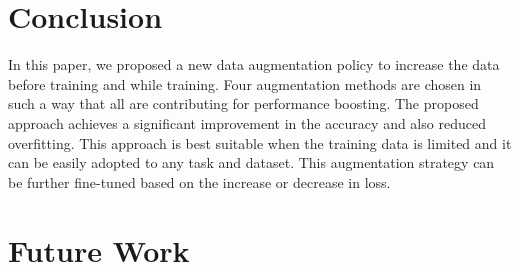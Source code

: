 \documentclass{article}
\begin{document}
\section{Conclusion}
In this paper, we proposed a new data augmentation policy to increase the data before training and while training. Four augmentation methods are chosen in such a way that all are contributing for performance boosting. The proposed approach achieves a significant improvement in the accuracy and also reduced overfitting. This approach is best suitable when the training data is limited and it can be easily adopted to any task and dataset. This augmentation strategy can be further fine-tuned based on the increase or decrease in loss.
\section{Future Work}
\end{document}
